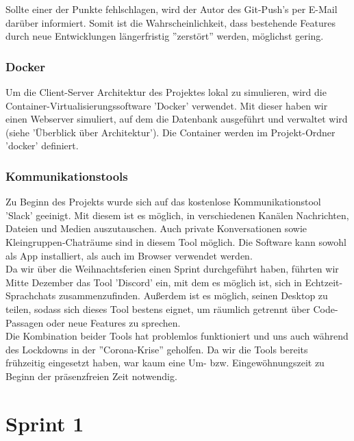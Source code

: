 \documentclass[twoside]{report}
\begin{document}
Sollte einer der Punkte fehlschlagen, wird der Autor des Git-Push's per E-Mail
darüber informiert. Somit ist die Wahrscheinlichkeit, dass bestehende Features durch
neue Entwicklungen längerfristig ''zerstört'' werden, möglichst gering.

\subsubsection{Docker}
Um die Client-Server Architektur des Projektes lokal zu simulieren, wird die
Container-Virtualisierungssoftware 'Docker' verwendet.
Mit dieser haben wir einen Webserver simuliert, auf dem die Datenbank ausgeführt
und verwaltet wird (siehe 'Überblick über Architektur'). Die Container werden
im Projekt-Ordner 'docker' definiert.


\subsubsection{Kommunikationstools}
Zu Beginn des Projekts wurde sich auf das kostenlose Kommunikationstool 'Slack' geeinigt.
Mit diesem ist es möglich, in verschiedenen Kanälen Nachrichten, Dateien und Medien auszutauschen.
Auch private Konversationen sowie Kleingruppen-Chaträume sind in diesem Tool möglich.
Die Software kann sowohl als App installiert, als auch im Browser verwendet werden.
\\Da wir über die Weihnachtsferien einen Sprint durchgeführt haben, führten wir Mitte Dezember
das Tool 'Discord' ein, mit dem es möglich ist, sich in Echtzeit-Sprachchats zusammenzufinden.
Außerdem ist es möglich, seinen Desktop zu teilen, sodass sich dieses Tool bestens eignet,
um räumlich getrennt über Code-Passagen oder neue Features zu sprechen.
\\Die Kombination beider Tools hat problemlos funktioniert und uns auch
während des Lockdowns in der ''Corona-Krise'' geholfen. Da wir die Tools bereits frühzeitig
eingesetzt haben, war kaum eine Um- bzw. Eingewöhnungszeit zu Beginn der
präsenzfreien Zeit notwendig.


\newpage


\section{Sprint 1}



\newpage
\end{document}
